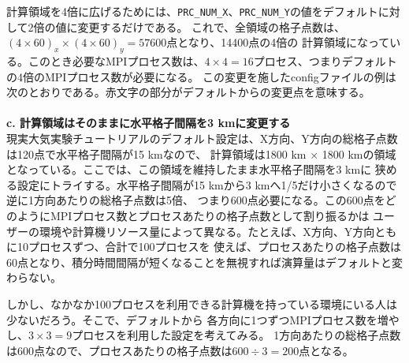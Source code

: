 計算領域を4倍に広げるためには、\verb|PRC_NUM_X|、\verb|PRC_NUM_Y|の値をデフォルトに対して2倍の値に変更するだけである。
これで、全領域の格子点数は、$(4 \times 60)_{x} \times (4 \times 60)_{y} = 57600$点となり、14400点の4倍の
計算領域になっている。このとき必要なMPIプロセス数は、$4 \times 4 = 16$プロセス、つまりデフォルトの4倍のMPIプロセス数が必要になる。
この変更を施したconfigファイルの例は次のとおりである。赤文字の部分がデフォルトからの変更点を意味する。\\

\\

\vspace{5mm}
{\bf c. 計算領域はそのままに水平格子間隔を3 kmに変更する}\\

現実大気実験チュートリアルのデフォルト設定は、X方向、Y方向の総格子点数は120点で水平格子間隔が15 kmなので、
計算領域は1800 km $\times$ 1800 kmの領域となっている。ここでは、この領域を維持したまま水平格子間隔を3 kmに
狭める設定にトライする。水平格子間隔が15 kmから3 kmへ1/5だけ小さくなるので逆に1方向あたりの総格子点数は5倍、
つまり600点必要になる。この600点をどのようにMPIプロセス数とプロセスあたりの格子点数として割り振るかは
ユーザーの環境や計算機リソース量によって異なる。たとえば、X方向、Y方向ともに10プロセスずつ、合計で100プロセスを
使えば、プロセスあたりの格子点数は60点となり、積分時間間隔が短くなることを無視すれば演算量はデフォルトと変わらない。

しかし、なかなか100プロセスを利用できる計算機を持っている環境にいる人は少ないだろう。そこで、デフォルトから
各方向に1つずつMPIプロセス数を増やし、$3 \times 3 = 9$プロセスを利用した設定を考えてみる。
1方向あたりの総格子点数は600点なので、プロセスあたりの格子点数は$600 \div 3 = 200$点となる。

